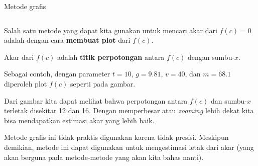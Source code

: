 \begin{frame}{Metode grafis}
\fontsize{9}{10}\selectfont

\begin{columns}

\begin{column}{0.6\textwidth}
  Salah satu metode yang dapat kita gunakan untuk mencari akar dari $f(c)=0$
  adalah dengan cara \textbf{membuat plot} dari $f(c)$.
  
  Akar dari $f(c)$ adalah
  \textbf{titik perpotongan} antara $f(c)$ dengan sumbu-$x$.

  Sebagai contoh, dengan parameter $t=10$, $g=9.81$, $v=40$, dan $m=68.1$
  diperoleh plot $f(c)$ seperti pada gambar.

  Dari gambar kita dapat melihat bahwa perpotongan antara $f(c)$ dan sumbu-$x$
  terletak disekitar 12 dan 16. Dengan memperbesar atau \textit{zooming} lebih
  dekat kita bisa mendapatkan estimasi akar yang lebih baik.

  Metode grafis ini tidak praktis digunakan karena tidak presisi.
  Meskipun demikian, metode ini dapat digunakan untuk mengestimasi letak
  dari akar (yang akan berguna pada metode-metode yang akan kita bahas nanti).
\end{column}


\end{columns}
\end{frame}
